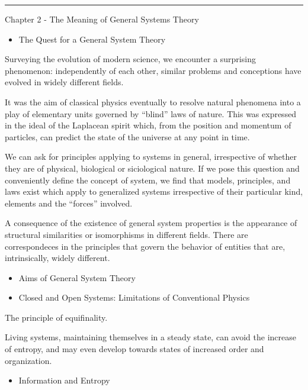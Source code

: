 \documentclass[
]{book}
\providecommand{\tightlist}{%
  \setlength{\itemsep}{0pt}\setlength{\parskip}{0pt}}
\begin{document}
\begin{center}\rule{0.5\linewidth}{0.5pt}\end{center}

Chapter 2 - The Meaning of General Systems Theory

\begin{itemize}
\tightlist
\item
  The Quest for a General System Theory
\end{itemize}

Surveying the evolution of modern science, we encounter a surprising phenomenon: independently of each other, similar problems and conceptions have evolved in widely different fields.

It was the aim of classical physics eventually to resolve natural phenomena into a play of elementary units governed by ``blind'' laws of nature. This was expressed in the ideal of the Laplacean spirit which, from the position and momentum of particles, can predict the state of the universe at any point in time.

We can ask for principles applying to systems in general, irrespective of whether they are of physical, biological or siciological nature. If we pose this question and conveniently define the concept of system, we find that models, principles, and laws exist which apply to generalized systems irrespective of their particular kind, elements and the ``forces'' involved.

A consequence of the existence of general system properties is the appearance of structural similarities or isomorphisms in different fields. There are correspondeces in the principles that govern the behavior of entities that are, intrinsically, widely different.

\begin{itemize}
\item
  Aims of General System Theory
\item
  Closed and Open Systems: Limitations of Conventional Physics
\end{itemize}

The principle of equifinality.

Living systems, maintaining themselves in a steady state, can avoid the increase of entropy, and may even develop towards states of increased order and organization.

\begin{itemize}
\tightlist
\item
  Information and Entropy
\end{itemize}
\end{document}
